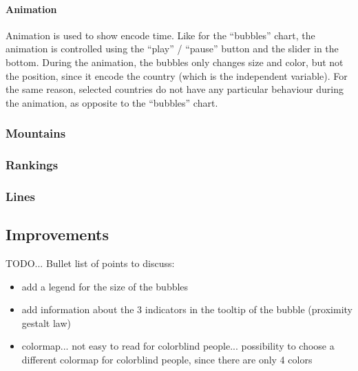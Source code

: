 \paragraph{Animation}
Animation is used to show encode time.
Like for the ``bubbles'' chart, the animation is controlled using the ``play'' / ``pause'' button and the slider in the bottom.
During the animation, the bubbles only changes size and color, but not the position, since it encode the country (which is the independent variable).
For the same reason, selected countries do not have any particular behaviour during the animation, as opposite to the ``bubbles'' chart.


\subsubsection{Mountains}


\subsubsection{Rankings}


\subsubsection{Lines}


\subsection{Improvements}
TODO...
Bullet list of points to discuss:
\begin{itemize}
    \item add a legend for the size of the bubbles
    \item add information about the 3 indicators in the tooltip of the bubble (proximity gestalt law)

    \item colormap... not easy to read for colorblind people... possibility to choose a different colormap for colorblind people, since there are only 4 colors
\end{itemize}
